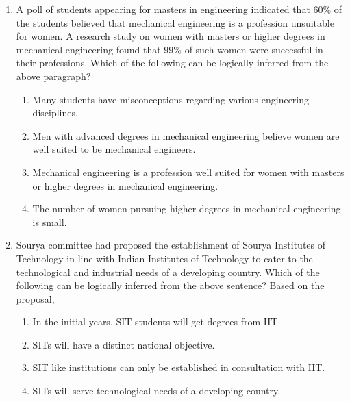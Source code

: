 \documentclass[journal,12pt,onecolumn]{IEEEtran}
\theoremstyle{remark}
\begin{document}
\begin{enumerate}[start=1, label=Q.\arabic*]
    \item A poll of students appearing for masters in engineering indicated that $60\%$ of the students believed that mechanical engineering is a profession unsuitable for women. A research study on women with masters or higher degrees in mechanical engineering found that $99\%$ of such women were successful in their professions.
    Which of the following can be logically inferred from the above paragraph?
    \begin{enumerate}
        \item Many students have misconceptions regarding various engineering disciplines.
        \item Men with advanced degrees in mechanical engineering believe women are well suited to be mechanical engineers.
        \item Mechanical engineering is a profession well suited for women with masters or higher degrees in mechanical engineering.
        \item The number of women pursuing higher degrees in mechanical engineering is small.
    \end{enumerate}

    \hfill{}

    \item Sourya committee had proposed the establishment of Sourya Institutes of Technology  in line with Indian Institutes of Technology  to cater to the technological and industrial needs of a developing country.
    Which of the following can be logically inferred from the above sentence?
    Based on the proposal,
    \begin{enumerate}
        \item[\brak{i}] In the initial years, SIT students will get degrees from IIT.
        \item[\brak{ii}] SITs will have a distinct national objective.
        \item[\brak{iii}] SIT like institutions can only be established in consultation with IIT.
        \item[\brak{iv}] SITs will serve technological needs of a developing country.
    \end{enumerate}
    \begin{enumerate}
    \end{enumerate}


\end{enumerate}
\end{document}

